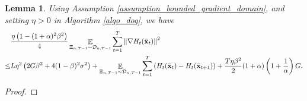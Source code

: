 \documentclass{article}
\newtheorem{Lemma}{\bf{Lemma}}
\begin{document}
\begin{Lemma}
\label{lemma_gradient_norm_bound}
Using Assumption \ref{assumption_bounded_gradient_domain}, and setting $\eta>0$ in Algorithm \ref{algo_dog}, we have 
\begin{align}
\nonumber
& \frac{\eta\left(  1-(1+\alpha)^2\beta^2  \right)}{4} \mathop{\mathbb{E}}_{ \Xi_{n,T-1} \sim \mathcal{D}_{n,T-1} }\sum_{t=1}^T\left\lVert\nabla H_t(\bar{{\bf x}}_t)\right\rVert^2 \\ \nonumber 
\le &  L\eta^2 \left(  2G\beta^2  +  4(1-\beta)^2 \sigma^2  \right)  + \mathop{\mathbb{E}}_{ \Xi_{n,T-1} \sim \mathcal{D}_{n,T-1} } \sum_{t=1}^T \left(  H_t(\bar{{\bf x}}_t) -  H_t(\bar{{\bf x}}_{t+1})  \right) + \frac{T \eta \beta^2}{2} (1+\alpha) \left( 1+\frac{1}{\alpha} \right)  G.
\end{align}


\end{Lemma}
\begin{proof}


\end{proof}
\end{document}
